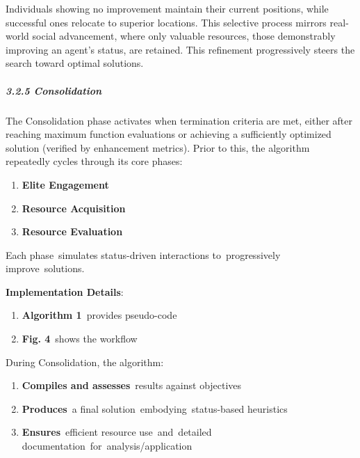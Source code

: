 \documentclass{article} %
\begin{document}
Individuals showing no improvement maintain their current positions, while successful ones relocate to superior locations. This selective process mirrors real-world social advancement, where only valuable resources, those demonstrably improving an agent's status, are retained. This refinement progressively steers the search toward optimal solutions.

\noindent 
\subparagraph{3.2.5 Consolidation}

The Consolidation phase activates when termination criteria are met, either after reaching maximum function evaluations or achieving a sufficiently optimized solution (verified by enhancement metrics). Prior to this, the algorithm repeatedly cycles through its core phases:

\begin{enumerate}
\item  \textbf{Elite Engagement}

\item \textbf{ Resource Acquisition}

\item \textbf{ Resource Evaluation}
\end{enumerate}



Each phase~simulates status-driven interactions to~progressively improve~solutions.

\textbf{Implementation Details}:

\begin{enumerate}
\item  \textbf{Algorithm 1}~provides pseudo-code

\item  \textbf{Fig. 4}~shows the workflow
\end{enumerate}

\noindent \textbf{}

During Consolidation, the algorithm:~

\begin{enumerate}
\item  \textbf{Compiles and assesses}~results against objectives

\item  \textbf{Produces}~a final solution~embodying~status-based heuristics

\item  \textbf{Ensures}~efficient resource use~and~detailed documentation~for~analysis/application
\end{enumerate}
\end{document}
